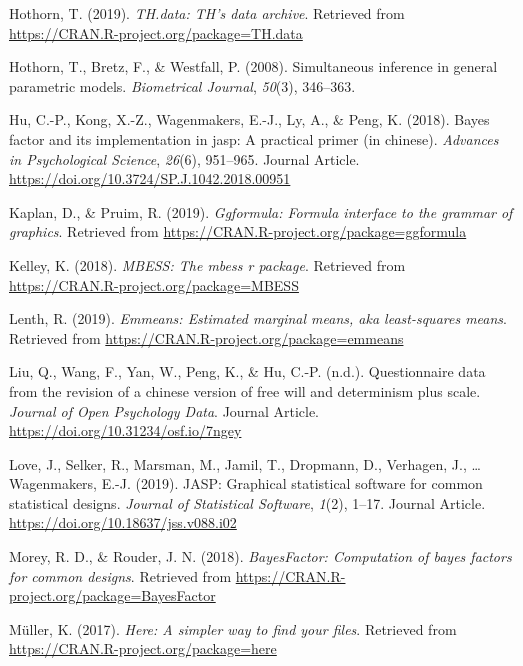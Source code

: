 \documentclass[man]{apa6}
\begin{document}
\leavevmode\hypertarget{ref-R-TH.data}{}%
Hothorn, T. (2019). \emph{TH.data: TH's data archive}. Retrieved from \url{https://CRAN.R-project.org/package=TH.data}

\leavevmode\hypertarget{ref-R-multcomp}{}%
Hothorn, T., Bretz, F., \& Westfall, P. (2008). Simultaneous inference in general parametric models. \emph{Biometrical Journal}, \emph{50}(3), 346--363.

\leavevmode\hypertarget{ref-Hu_2018_JASP}{}%
Hu, C.-P., Kong, X.-Z., Wagenmakers, E.-J., Ly, A., \& Peng, K. (2018). Bayes factor and its implementation in jasp: A practical primer (in chinese). \emph{Advances in Psychological Science}, \emph{26}(6), 951--965. Journal Article. \url{https://doi.org/10.3724/SP.J.1042.2018.00951}

\leavevmode\hypertarget{ref-R-ggformula}{}%
Kaplan, D., \& Pruim, R. (2019). \emph{Ggformula: Formula interface to the grammar of graphics}. Retrieved from \url{https://CRAN.R-project.org/package=ggformula}

\leavevmode\hypertarget{ref-R-MBESS}{}%
Kelley, K. (2018). \emph{MBESS: The mbess r package}. Retrieved from \url{https://CRAN.R-project.org/package=MBESS}

\leavevmode\hypertarget{ref-R-emmeans}{}%
Lenth, R. (2019). \emph{Emmeans: Estimated marginal means, aka least-squares means}. Retrieved from \url{https://CRAN.R-project.org/package=emmeans}

\leavevmode\hypertarget{ref-Liu_2019_JOPD}{}%
Liu, Q., Wang, F., Yan, W., Peng, K., \& Hu, C.-P. (n.d.). Questionnaire data from the revision of a chinese version of free will and determinism plus scale. \emph{Journal of Open Psychology Data}. Journal Article. \url{https://doi.org/10.31234/osf.io/7ngey}

\leavevmode\hypertarget{ref-Love_etal_2019_JASP}{}%
Love, J., Selker, R., Marsman, M., Jamil, T., Dropmann, D., Verhagen, J., \ldots{} Wagenmakers, E.-J. (2019). JASP: Graphical statistical software for common statistical designs. \emph{Journal of Statistical Software}, \emph{1}(2), 1--17. Journal Article. \url{https://doi.org/10.18637/jss.v088.i02}

\leavevmode\hypertarget{ref-R-BayesFactor}{}%
Morey, R. D., \& Rouder, J. N. (2018). \emph{BayesFactor: Computation of bayes factors for common designs}. Retrieved from \url{https://CRAN.R-project.org/package=BayesFactor}

\leavevmode\hypertarget{ref-R-here}{}%
Müller, K. (2017). \emph{Here: A simpler way to find your files}. Retrieved from \url{https://CRAN.R-project.org/package=here}
\end{document}
